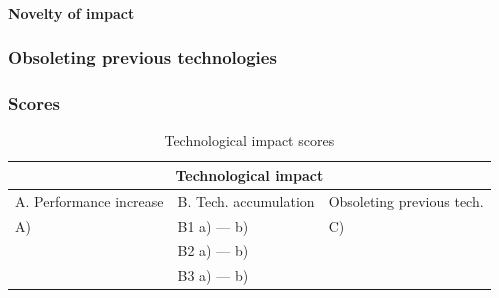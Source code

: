 \paragraph{Novelty of impact}

\subsubsection{Obsoleting previous technologies}

\subsubsection{Scores}
\begin{table}[h]
\centering
\begin{tabular}{l l l}
\hline
\multicolumn{3}{|c|}{Technological impact} \\
\hline
A. Performance increase & B. Tech. accumulation & Obsoleting previous tech.\\
A)   & B1 a)  --- b)  & C) \\ 
     & B2 a)  --- b)  & \\
     & B3 a)  --- b)  & \\
\hline
\end{tabular}
\caption{Technological impact scores}
\label{tbl:impactscores2}
\end{table}